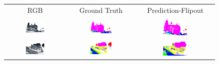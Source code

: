     \begin{figure}[h!]
        \begin{tabular}{ccc}
            RGB & Ground Truth & Prediction-Flipout \\
            \includegraphics[width=0.33\textwidth, height=0.18\textheight]{images/seg_output/sem3d_seg_output/1_RGB.pdf} &
            \includegraphics[width=0.33\textwidth, height=0.18\textheight]{images/seg_output/sem3d_seg_output/1_GT.pdf}& 
            \includegraphics[width=0.33\textwidth, height=0.18\textheight]{images/seg_output/flipout/sem3d_1.pdf}\\

            \includegraphics[width=0.33\textwidth, height=0.18\textheight]{images/seg_output/sem3d_seg_output/2_RGB.pdf} &
            \includegraphics[width=0.33\textwidth, height=0.18\textheight]{images/seg_output/sem3d_seg_output/2_GT.pdf}& 
            \includegraphics[width=0.33\textwidth, height=0.18\textheight]{images/seg_output/flipout/sem3d_2.pdf}\\


\end{tabular}
\end{figure}

